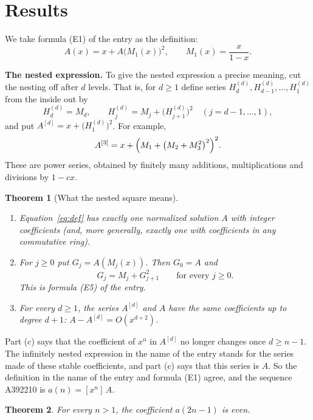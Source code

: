 \documentclass[11pt,a4paper]{article}
\newtheorem{theorem}{Theorem}[section]
\theoremstyle{definition}
\theoremstyle{remark}
\newcommand{\coeff}[2]{[x^{#1}]\,#2}
\newcommand{\para}[1]{\par\medskip\noindent\textbf{#1}\enspace}
\begin{document}
\section{Results}\label{sec:results}

We take formula (E1) of the entry as the definition:
\begin{equation}\label{eq:def}
A(x)=x+A\bigl(M_1(x)\bigr)^2,\qquad M_1(x)=\frac{x}{1-x}.
\end{equation}

\para{The nested expression.} To give the nested expression a precise meaning, cut the nesting off after $d$ levels. That is, for
$d\ge1$ define series $H^{(d)}_d,H^{(d)}_{d-1},\dots,H^{(d)}_1$ from the inside out by
\[
H^{(d)}_d=M_d,\qquad H^{(d)}_j=M_j+\bigl(H^{(d)}_{j+1}\bigr)^2\quad(j=d-1,\dots,1),
\]
and put $A^{[d]}=x+\bigl(H^{(d)}_1\bigr)^2$. For example,
\[
A^{[3]}=x+\Bigl(M_1+\bigl(M_2+M_3^2\bigr)^2\Bigr)^2 .
\]
These are power series, obtained by finitely many additions, multiplications and divisions by $1-cx$.

\begin{theorem}[What the nested square means]\label{thm:def}
\begin{enumerate}[label=(\alph*)]
\item Equation~\eqref{eq:def} has exactly one normalized solution $A$ with integer coefficients (and, more generally,
exactly one with coefficients in any commutative ring).
\item For $j\ge0$ put $G_j=A(M_j(x))$. Then $G_0=A$ and
\[
G_j=M_j+G_{j+1}^2\qquad\text{for every }j\ge0 .
\]
This is formula (E5) of the entry.
\item For every $d\ge1$, the series $A^{[d]}$ and $A$ have the same coefficients up to degree $d+1$:
$A-A^{[d]}=O(x^{d+2})$.
\end{enumerate}
\end{theorem}

Part (c) says that the coefficient of $x^n$ in $A^{[d]}$ no longer changes once $d\ge n-1$. The infinitely nested
expression in the name of the entry stands for the series made of these stable coefficients, and part (c) says that this series is
$A$. So the definition in the name of the entry and formula (E1) agree, and the sequence A392210 is $a(n)=\coeff{n}{A}$.

\begin{theorem}\label{thm:main}
For every $n>1$, the coefficient $a(2n-1)$ is even.
\end{theorem}
\end{document}
